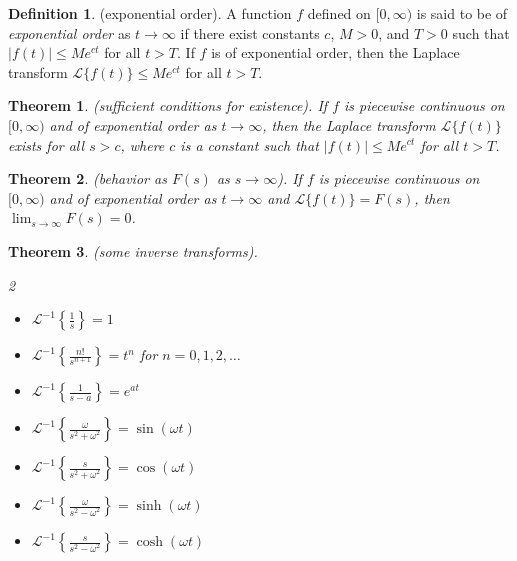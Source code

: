 \documentclass{article}
\theoremstyle{plain}
\newtheorem{thm}{Theorem}[section]
\theoremstyle{definition}
\newtheorem{defn}{Definition}[section]
\theoremstyle{remark}
\begin{document}
\begin{defn} (exponential order).
    A function \(f\) defined on \([0, \infty)\) is said to be of \emph{exponential order} as \(t\to\infty\) if there exist constants \(c\), \(M > 0\), and \(T > 0\) such that \(\vert f(t) \vert \leq M e^{ct}\) for all \(t > T\). If \(f\) is of exponential order, then the Laplace transform \(\mathcal{L} \{f(t)\} \leq Me^{ct}\) for all \(t > T\).
\end{defn}

\begin{thm} (sufficient conditions for existence).
    If \(f\) is piecewise continuous on \([0, \infty)\) and of exponential order as \(t \to \infty\), then the Laplace transform \(\mathcal{L} \{f(t)\}\) exists for all \(s > c\), where \(c\) is a constant such that \(\vert f(t) \vert \leq Me^{ct}\) for all \(t > T\).
\end{thm}

\begin{thm} (behavior as \(F(s)\) as \(s \to \infty\)).
    If \(f\) is piecewise continuous on \([0, \infty)\) and of exponential order as \(t \to \infty\) and \(\mathcal{L} \{f(t)\} = F(s)\), then \(\displaystyle\lim_{s \to \infty} F(s) = 0\).
\end{thm}

\begin{thm} (some inverse transforms).
    \begin{multicols}{2}
    \begin{itemize}
        \item [(a)] \(\displaystyle\mathcal{L}^{-1} \left\{ \frac{1}{s} \right\} = 1\)
        \item [(b)] \(\displaystyle\mathcal{L}^{-1} \left\{ \frac{n!}{s^{n+1}} \right\} = t^n\) for \(n = 0, 1, 2, \ldots\)
        \item [(c)] \(\displaystyle\mathcal{L}^{-1} \left\{ \frac{1}{s-a} \right\} = e^{at}\)
        \item [(d)] \(\displaystyle\mathcal{L}^{-1} \left\{ \frac{\omega}{s^2 + \omega^2} \right\} = \sin(\omega t)\)
        \item [(e)] \(\displaystyle\mathcal{L}^{-1} \left\{ \frac{s}{s^2 + \omega^2} \right\} = \cos(\omega t)\)
        \item [(f)] \(\displaystyle\mathcal{L}^{-1} \left\{ \frac{\omega}{s^2 - \omega^2} \right\} = \sinh(\omega t)\)
        \item [(g)] \(\displaystyle\mathcal{L}^{-1} \left\{ \frac{s}{s^2 - \omega^2} \right\} = \cosh(\omega t)\)
    \end{itemize}
    \end{multicols}
\end{thm}
\end{document}
